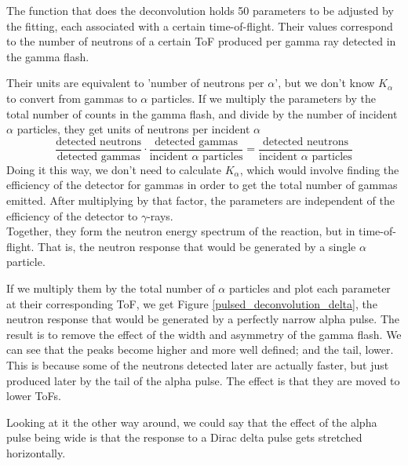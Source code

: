 \documentclass[a4paper,12pt]{report}
\begin{document}
The function that does the deconvolution holds \num{50} parameters to be adjusted by the fitting, each associated with a certain time-of-flight.
Their values correspond to the number of neutrons of a certain ToF produced per gamma ray detected in the gamma flash.

Their units are equivalent to 'number of neutrons per $\alpha$', but we don't know $K_\alpha$ to convert from gammas to $\alpha$ particles.
If we multiply the parameters by the total number of counts in the gamma flash, and divide by the number of incident $\alpha$ particles, they get units of neutrons per incident $\alpha$
\begin{equation}
	\frac{\text{detected neutrons}}{\text{detected gammas}}\cdot \frac{\text{detected gammas}}{\text{incident $\alpha$ particles}} = \frac{\text{detected neutrons}}{\text{incident $\alpha$ particles}}
\end{equation}
Doing it this way, we don't need to calculate $K_\alpha$, which would involve finding the efficiency of the detector for gammas in order to get the total number of gammas emitted.
After multiplying by that factor, the parameters are independent of the efficiency of the detector to $\gamma$-rays.
\\

Together, they form the neutron energy spectrum of the reaction, but in time-of-flight.
That is, the neutron response that would be generated by a single $\alpha$ particle.

If we multiply them by the total number of $\alpha$ particles and plot each parameter at their corresponding ToF, we get Figure \ref{pulsed_deconvolution_delta}, the neutron response that would be generated by a perfectly narrow alpha pulse.
The result is to remove the effect of the width and asymmetry of the gamma flash.
We can see that the peaks become higher and more well defined; and the tail, lower.
This is because some of the neutrons detected later are actually faster, but just produced later by the tail of the alpha pulse.
The effect is that they are moved to lower ToFs.

Looking at it the other way around, we could say that the effect of the alpha pulse being wide is that the response to a Dirac delta pulse gets stretched horizontally.
\\
\end{document}
